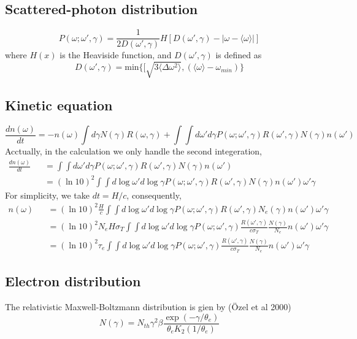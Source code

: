 \documentclass[12pt]{book}
\begin{document}
\subsection{Scattered-photon distribution}
\begin{equation}
P(\omega;\omega',\gamma)=\frac{1}{2D(\omega',\gamma)}H[D(\omega',\gamma)-
|\omega-\langle\omega\rangle|]
\end{equation}
where $H(x)$ is the Heaviside function, and $D(\omega',\gamma)$ is defined as
\begin{equation}
D(\omega',\gamma)=\mathrm{min}\{[\sqrt{3\langle\Delta\omega^2\rangle},
(\langle\omega\rangle-\omega_{min})\}
\end{equation}

\subsection{Kinetic equation}
\begin{equation}
\frac{dn(\omega)}{dt}=-n(\omega)\int d\gamma N(\gamma)R(\omega,\gamma)+\int\int d\omega'd\gamma
P(\omega;\omega',\gamma)R(\omega',\gamma)N(\gamma)n(\omega')
\end{equation}
Acctually, in the calculation we only handle the second integeration,
\begin{eqnarray}
\frac{dn(\omega)}{dt}&&=\int\int d\omega'd\gamma
P(\omega;\omega',\gamma)R(\omega',\gamma)N(\gamma)n(\omega')\nonumber\\
&&=(\ln10)^2\int\int d\log\omega'd\log\gamma
P(\omega;\omega',\gamma)R(\omega',\gamma)N(\gamma)n(\omega')\omega'\gamma
\end{eqnarray}
For simplicity, we take $dt=H/c$, consequently,
\begin{eqnarray}
n(\omega)&&=(\ln10)^2\frac{H}{c}\int\int d\log\omega'd\log\gamma
P(\omega;\omega',\gamma)R(\omega',\gamma)N_e(\gamma)n(\omega')\omega'\gamma\\
&&=(\ln10)^2N_{e}H\sigma_T\int\int d\log\omega'd\log\gamma
P(\omega;\omega',\gamma)\frac{R(\omega',\gamma)}{c\sigma_T}
\frac{N(\gamma)}{N_e}n(\omega')\omega'\gamma\\
&&=(\ln10)^2\tau_e\int\int d\log\omega'd\log\gamma
P(\omega;\omega',\gamma)\frac{R(\omega',\gamma)}{c\sigma_T}
\frac{N(\gamma)}{N_e}n(\omega')\omega'\gamma
\end{eqnarray}
\subsection{Electron distribution}
The relativistic Maxwell-Boltzmann distribution is gien by (\"{O}zel et al 2000)
\begin{equation}
N(\gamma)=N_{th}\gamma^2\beta
\frac{\exp\left(-\gamma/\theta_e\right)}{\theta_e K_2(1/\theta_e)}
\end{equation}
\end{document}
